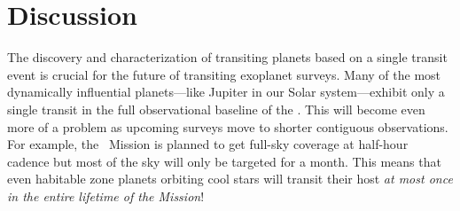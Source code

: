 

\section{Discussion}

The discovery and characterization of transiting planets based on a single
transit event is crucial for the future of transiting exoplanet surveys.
Many of the most dynamically influential planets---like Jupiter in our Solar
system---exhibit only a single transit in the full observational baseline of
the \kepler.
This will become even more of a problem as upcoming surveys move to shorter
contiguous observations.
For example, the \tess\ Mission is planned to get full-sky coverage at
half-hour cadence but most of the sky will only be targeted for a month.
This means that even habitable zone planets orbiting cool stars will transit
their host \emph{at most once in the entire lifetime of the Mission}!

